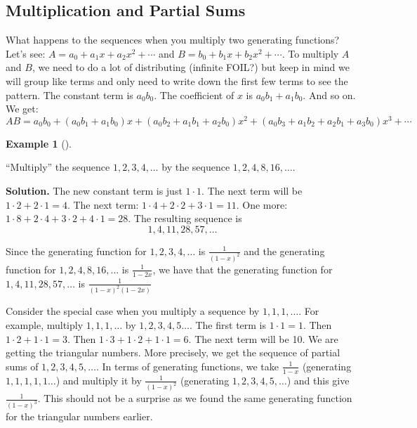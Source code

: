 \documentclass[10pt,]{book}
\theoremstyle{plain}
\theoremstyle{definition}
\newtheorem{example}[theorem]{Example}
\theoremstyle{definition}
\theoremstyle{definition}
\numberwithin{equation}{chapter}
\begin{document}
\subsection[Multiplication and Partial Sums]{Multiplication and Partial Sums}\label{subsection-44}

What happens to the sequences when you multiply two generating functions? Let's see: \(A = a_0 + a_1x + a_2x^2 + \cdots\) and \(B = b_0 + b_1x + b_2x^2 + \cdots\). To multiply \(A\) and \(B\), we need to do a lot of distributing (infinite FOIL?) but keep in mind we will group like terms and only need to write down the first few terms to see the pattern. The constant term is \(a_0b_0\). The coefficient of \(x\) is \(a_0b_1 + a_1b_0\). And so on. We get:
\begin{equation*}
  AB = a_0b_0 + (a_0b_1 + a_1b_0)x + (a_0b_2 + a_1b_1 + a_2b_0)x^2 + (a_0b_3 + a_1b_2 + a_2b_1 + a_3b_0)x^3 + \cdots
\end{equation*}
%
\begin{example}[]\label{example-113}

``Multiply'' the sequence \(1, 2, 3, 4, \ldots\) by the sequence \(1, 2, 4, 8, 16, \ldots\).
%
\par\medskip\noindent%
\textbf{Solution.}\quad
The new constant term is just \(1 \cdot 1\). The next term will be \(1\cdot 2 + 2 \cdot 1 = 4\). The next term: \(1 \cdot 4 + 2 \cdot 2 + 3 \cdot 1 = 11\). One more: \(1 \cdot 8 + 2 \cdot 4 + 3 \cdot 2 + 4 \cdot 1 = 28\). The resulting sequence is
\begin{equation*}
  1, 4, 11, 28, 57, \ldots
\end{equation*}
%
\par

Since the generating function for \(1,2,3,4, \ldots\) is \(\frac{1}{(1-x)^2}\) and the generating function for \(1,2,4,8, 16, \ldots\) is \(\frac{1}{1-2x}\), we have that the generating function for \(1,4, 11, 28, 57, \ldots\) is \(\frac{1}{(1-x)^2(1-2x)}\)
%
\end{example}
\par

Consider the special case when you multiply a sequence by \(1, 1, 1, \ldots\). For example, multiply \(1,1,1,\ldots\) by \(1, 2, 3, 4, 5\ldots\). The first term is \(1\cdot 1 = 1\). Then \(1\cdot 2 + 1 \cdot 1 = 3\). Then \(1\cdot 3 + 1\cdot 2 + 1 \cdot 1 = 6\). The next term will be 10. We are getting the triangular numbers. More precisely, we get the sequence of partial sums of \(1,2,3,4,5, \ldots\).
In terms of generating functions, we take \(\frac{1}{1-x}\) (generating \(1,1,1,1,1\ldots\)) and multiply it by \(\frac{1}{(1-x)^2}\) (generating \(1,2,3,4,5,\ldots\)) and this give \(\frac{1}{(1-x)^3}\). This should not be a surprise as we found the same generating function for the triangular numbers earlier.
%
\par
\end{document}
